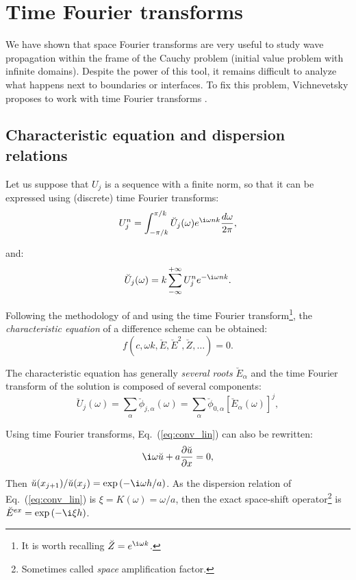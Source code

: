 \section{Time Fourier transforms \label{sec:time}}
We have shown that space Fourier transforms are very useful to study wave propagation within the frame of the Cauchy problem (initial value problem with infinite domains). Despite the power of this tool, it remains difficult to analyze what happens next to boundaries or interfaces. To fix this problem, Vichnevetsky proposes to work with time Fourier transforms \cite{Vichnevetsky:1982}.

\subsection{Characteristic equation and dispersion relations}
Let us suppose that $U_j$ is a sequence with a finite norm, so that it can be expressed using (discrete) time Fourier transforms:
$$  U^n_j = \int_{-\pi/k}^{\pi/k} \breve{U}_j(\omega) e^{\i \omega n k} \frac{d\omega}{2\pi}, $$

\noindent and:
$$ \breve{U}_j(\omega) = k \sum_{-\infty}^{+\infty} U^n_j e^{-\i \omega n k }.$$

\noindent Following the methodology of \cite{Vichnevetsky:1982} and using the time Fourier transform\footnote{It is worth recalling $\breve{Z}=e^{\i \omega k}$.}, the \emph{characteristic equation} of a difference scheme can be obtained:
$$ f(c,\omega k,\breve{E},\breve{E}^2,\breve{Z},\dots ) = 0.$$

\noindent The characteristic equation has generally \emph{several roots} $\breve{E}_{\alpha}$ and the time Fourier transform of the solution is composed of several components:
$$  \breve{U}_j (\omega) = \sum_{\alpha} \breve{\phi}_{j,\alpha}(\omega) = \sum_{\alpha} \breve{\phi}_{0,\alpha} \left[\breve{E}_{\alpha}(\omega)\right]^j, $$


\noindent Using time Fourier transforms, Eq.~(\ref{eq:conv_lin}) can also be rewritten:
\begin{equation}
\label{eq:conv_lin_time}
\i \omega \breve{u} + a \ddx{\breve{u}} = 0,
\end{equation}

\noindent Then $\breve{u}(x_{j+1})/\breve{u}(x_{j})=\exp \left(-\i \omega h / a\right)$. As the dispersion relation of Eq.~(\ref{eq:conv_lin}) is $\xi=K(\omega)=\omega / a$, then the exact space-shift operator\footnote{Sometimes called \emph{space} amplification factor.} is $\breve{E}^{ex} = \exp \left(-\i \xi h \right)$.

